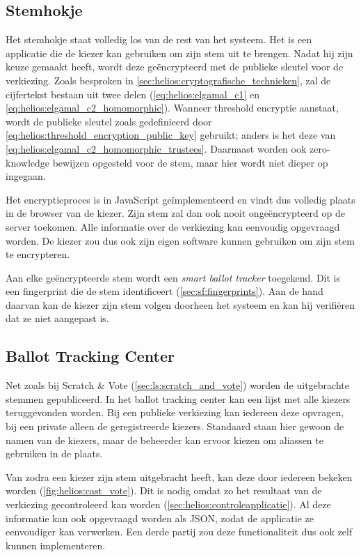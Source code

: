 \subsection{Stemhokje}
\label{sec:helios:stemhokje}

Het stemhokje staat volledig los van de rest van het systeem. Het is een applicatie die de kiezer kan gebruiken om zijn stem uit te brengen. Nadat hij zijn keuze gemaakt heeft, wordt deze ge\"encrypteerd met de publieke sleutel voor de verkiezing. Zoals besproken in \ref{sec:helios:cryptografische_technieken}, zal de cijfertekst bestaan uit twee delen (\ref{eq:helios:elgamal_c1} en \ref{eq:helios:elgamal_c2_homomorphic}). Wanneer threshold encryptie aanstaat, wordt de publieke sleutel zoals gedefinieerd door \ref{eq:helios:threshold_encryption_public_key} gebruikt; anders is het deze van \ref{eq:helios:elgamal_c2_homomorphic_trustees}. Daarnaast worden ook zero-knowledge bewijzen opgesteld voor de stem, maar hier wordt niet dieper op ingegaan.

\npar Het encryptieproces is in JavaScript ge\"implementeerd en vindt dus volledig plaats in de browser van de kiezer. Zijn stem zal dan ook nooit onge\"encrypteerd op de server toekomen. Alle informatie over de verkiezing kan eenvoudig opgevraagd worden. De kiezer zou dus ook zijn eigen software kunnen gebruiken om zijn stem te encrypteren.

\npar Aan elke ge\"encrypteerde stem wordt een \textit{smart ballot tracker} toegekend. Dit is een fingerprint die de stem identificeert (\ref{sec:sf:fingerprints}). Aan de hand daarvan kan de kiezer zijn stem volgen doorheen het systeem en kan hij verifi\"eren dat ze niet aangepast is.

\subsection{Ballot Tracking Center}
\label{sec:helios:ballot_tracking_center}

Net zoals bij Scratch \& Vote (\ref{sec:ls:scratch_and_vote}) worden de uitgebrachte stemmen gepubliceerd. In het ballot tracking center kan een lijst met alle kiezers teruggevonden worden. Bij een publieke verkiezing kan iedereen deze opvragen, bij een private alleen de geregistreerde kiezers. Standaard staan hier gewoon de namen van de kiezers, maar de beheerder kan ervoor kiezen om aliassen te gebruiken in de plaats.

\npar Van zodra een kiezer zijn stem uitgebracht heeft, kan deze door iedereen bekeken worden (\ref{fig:helios:cast_vote}). Dit is nodig omdat zo het resultaat van de verkiezing gecontroleerd kan worden (\ref{sec:helios:controleapplicatie}). Al deze informatie kan ook opgevraagd worden als JSON, zodat de applicatie ze eenvoudiger kan verwerken. Een derde partij zou deze functionaliteit dus ook zelf kunnen implementeren.

